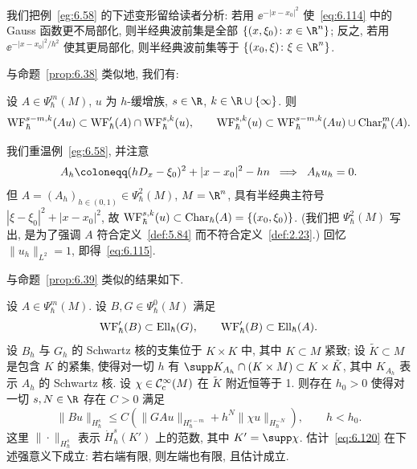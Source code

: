 我们把例~\ref{eg:6.58} 的下述变形留给读者分析: 若用 $\ee^{-|x - x_0|^2}$ 使~\eqref{eq:6.114} 中的 Gauss 函数更不局部化, 则半经典波前集是全部 $\{(x, \xi_0) \colon x \in \R^n\}$; 反之, 若用 $\ee^{-|x - x_0|^2/h^2}$ 使其更局部化, 则半经典波前集等于 $\{(x_0, \xi) \colon \xi \in \R^n\}$.

与命题~\ref{prop:6.38} 类似地, 我们有:

\begin{proposition}[半经典微局部性与微局部椭圆正则性]\label{prop:6.59}
设 $A \in \Psi^m_{\hbar}(M)$, $u$ 为 $h$-缓增族, $s \in \R$, $k \in \R \cup \{\infty\}$. 则
\begin{equation}\label{eq:6.117}
    \operatorname{WF}^{s-m,k}_{\hbar}(A u) \subset \operatorname{WF}'_{\hbar}(A) \cap \operatorname{WF}^{s,k}_{\hbar}(u), \qquad \operatorname{WF}^{s,k}_{\hbar}(u) \subset \operatorname{WF}^{s-m,k}_{\hbar}(A u) \cup \operatorname{Char}^m_{\hbar}(A).
\end{equation}
\end{proposition}

\begin{example}\label{eg:6.60}
我们重温例~\ref{eg:6.58}, 并注意
\begin{equation}\label{eq:6.118}
    A_h \defeq (hD_x - \xi_0)^2 + |x - x_0|^2 - h n \;\; \Longrightarrow \;\; A_h u_h = 0.
\end{equation}
但 $A = (A_h)_{h \in (0,1)} \in \Psi^2_{\hbar}(M)$, $M = \R^n$, 具有半经典主符号 $|\xi - \xi_0|^2 + |x - x_0|^2$, 故 $\operatorname{WF}^{s,k}_{\hbar}(u) \subset \operatorname{Char}_{\hbar}(A) = \{(x_0, \xi_0)\}$. (我们把 $\Psi^2_{\hbar}(M)$ 写出, 是为了强调 $A$ 符合定义~\ref{def:5.84} 而不符合定义~\ref{def:2.23}.) 回忆 $\|u_h\|_{L^2} = 1$, 即得~\eqref{eq:6.115}.
\end{example}

与命题~\ref{prop:6.39} 类似的结果如下.

\begin{proposition}[定量半经典微局部椭圆估计]\label{prop:6.61}
设 $A \in \Psi^m_{\hbar}(M)$. 设 $B, G \in \Psi^0_{\hbar}(M)$ 满足
\begin{equation}\label{eq:6.119}
    \operatorname{WF}'_{\hbar}(B) \subset \operatorname{Ell}_{\hbar}(G), \qquad \operatorname{WF}'_{\hbar}(B) \subset \operatorname{Ell}_{\hbar}(A).
\end{equation}
设 $B_h$ 与 $G_h$ 的 Schwartz 核的支集位于 $K \times K$ 中, 其中 $K \subset M$ 紧致; 设 $\tilde{K} \subset M$ 是包含 $K$ 的紧集, 使得对一切 $h$ 有 $\supp K_{A_h} \cap (K \times M) \subset K \times \tilde{K}$, 其中 $K_{A_h}$ 表示 $A_h$ 的 Schwartz 核. 设 $\chi \in \mathcal{C}_{\mathrm{c}}^\infty(M)$ 在 $\tilde{K}$ 附近恒等于 1. 则存在 $h_0 > 0$ 使得对一切 $s, N \in \R$ 存在 $C > 0$ 满足
\begin{equation}\label{eq:6.120}
    \|B u\|_{H^s_{\hbar}} \le C \left( \|G A u\|_{H^{s-m}_{\hbar}} + h^N \|\chi u\|_{H^{-N}_{\hbar}} \right), \qquad h < h_0.
\end{equation}
这里 $\|\cdot\|_{H^s_{\hbar}}$ 表示 $\dot{H}^s_{\hbar}(K')$ 上的范数, 其中 $K' = \supp \chi$. 估计~\eqref{eq:6.120} 在下述强意义下成立: 若右端有限, 则左端也有限, 且估计成立.
\end{proposition}

